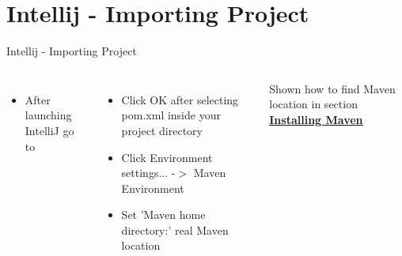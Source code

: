 \documentclass[aspectratio=1610,english]{beamer} %
\begin{document}
  	\section{Intellij - Importing Project}
	\begin{frame}{Intellij - Importing Project}
		\begin{columns}
				\begin{itemize}
					\tiny
					\color{black}
					\item After launching IntelliJ go to
				\end{itemize}
				\fontsize{4}{5} \selectfont
				\begin{itemize}
					\tiny
					\color{black}
					\item Click OK after selecting pom.xml inside your project directory
					\item Click Environment settings... -$>$ Maven Environment
					\item Set 'Maven home directory:' real Maven location 
				\end{itemize}
				\fontsize{4}{5} \selectfont
				Shown how to find Maven location in section 
					\hyperlink{page.6}{\textbf{\underline{Installing Maven}}}
					

\end{columns}
\end{frame}
\end{document}
